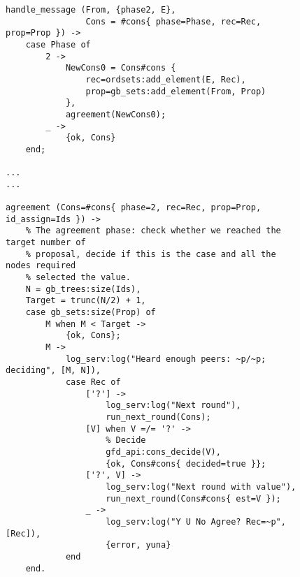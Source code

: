 \begin{figure}[hbt]
\begin{lstlisting}[caption={Agreement Phase},
                   label={code:ConsAgreement}]
handle_message (From, {phase2, E},
                Cons = #cons{ phase=Phase, rec=Rec, prop=Prop }) ->
    case Phase of
        2 ->
            NewCons0 = Cons#cons {
                rec=ordsets:add_element(E, Rec),
                prop=gb_sets:add_element(From, Prop)
            },
            agreement(NewCons0);
        _ ->
            {ok, Cons}
    end;

...
...

agreement (Cons=#cons{ phase=2, rec=Rec, prop=Prop, id_assign=Ids }) ->
    % The agreement phase: check whether we reached the target number of
    % proposal, decide if this is the case and all the nodes required
    % selected the value.
    N = gb_trees:size(Ids),
    Target = trunc(N/2) + 1,
    case gb_sets:size(Prop) of
        M when M < Target ->
            {ok, Cons};
        M ->
            log_serv:log("Heard enough peers: ~p/~p; deciding", [M, N]),
            case Rec of
                ['?'] ->
                    log_serv:log("Next round"),
                    run_next_round(Cons);
                [V] when V =/= '?' ->
                    % Decide
                    gfd_api:cons_decide(V),
                    {ok, Cons#cons{ decided=true }};
                ['?', V] ->
                    log_serv:log("Next round with value"),
                    run_next_round(Cons#cons{ est=V });
                _ ->
                    log_serv:log("Y U No Agree? Rec=~p", [Rec]),
                    {error, yuna}
            end
    end.
\end{lstlisting}
\end{figure}

